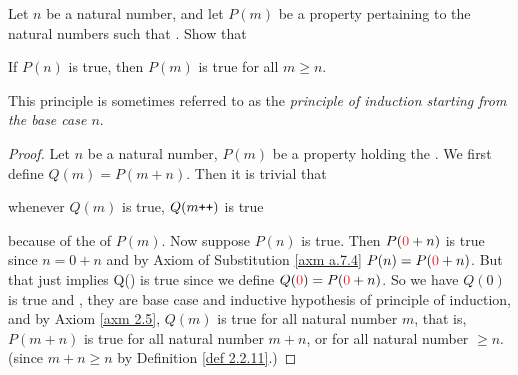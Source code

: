 \setcounter{exercise}{7}
\begin{exercise} \label{exercise 2.2.8}
Let \(n\) be a natural number, and let \(P(m)\) be a property pertaining to the natural numbers such that .  Show that
    \begin{center}
    If \(P(n)\) is true, then \(P(m)\) is true for all \(m \geq n\). 
    \end{center}
This principle is sometimes referred to as the \emph{principle of induction starting from the base case \(n\)}.
\end{exercise}
\begin{proof}
Let \(n\) be a natural number, \(P(m)\) be a property holding the . We first define \(Q(m) = P(m + n)\). Then it is trivial that     \begin{center}
    whenever \(Q(m)\) is true, \(Q(m\texttt{++})\) is true 
    \end{center}
because of the  of \(P(m)\). Now suppose \(P(n)\) is true. Then \(P(\RED{0} + n)\) is true since \(n = 0 + n\) and by Axiom of Substitution \ref{axm a.7.4} \(P(n) = P(\RED{0} + n)\). But that just implies Q() is true since we define \(Q(\RED{0}) = P(\RED{0} + n)\). So we have \(Q(0)\) is true and , they are base case and inductive hypothesis of principle of induction, and by Axiom \ref{axm 2.5}, \(Q(m)\) is true for all natural number \(m\), that is, \(P(m + n)\) is true for all natural number \(m + n\), or for all natural number \(\geq n\). (since \(m + n \geq n\) by Definition \ref{def 2.2.11}.)
\end{proof}